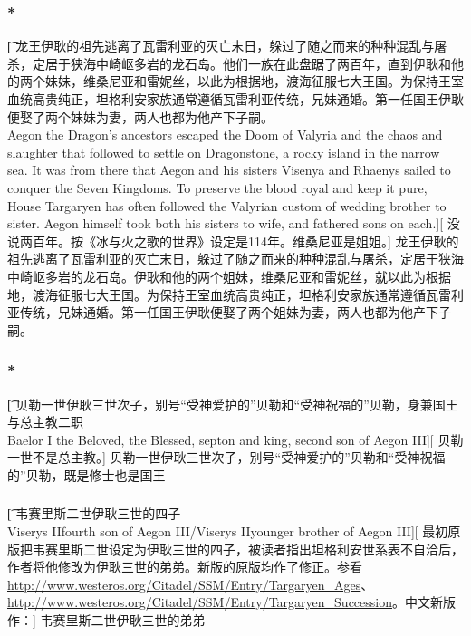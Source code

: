 \documentclass[12pt,a4paper]{article}
\begin{document}
\subsubsection{\color{red}*}\t[
	龙王伊耿的祖先逃离了瓦雷利亚的灭亡末日，躲过了随之而来的种种混乱与屠杀，定居于狭海中崎岖多岩的龙石岛。他们一族在此盘踞了两百年，直到伊耿和他的两个妹妹，维桑尼亚和雷妮丝，以此为根据地，渡海征服七大王国。为保持王室血统高贵纯正，坦格利安家族通常遵循瓦雷利亚传统，兄妹通婚。第一任国王伊耿便娶了两个妹妹为妻，两人也都为他产下子嗣。\\
	Aegon the Dragon's ancestors escaped the Doom of Valyria and the chaos and slaughter that followed to settle on Dragonstone, a rocky island in the narrow sea. It was from there that Aegon and his sisters Visenya and Rhaenys sailed to conquer the Seven Kingdoms. To preserve the blood royal and keep it pure, House Targaryen has often followed the Valyrian custom of wedding brother to sister. Aegon himself took both his sisters to wife, and fathered sons on each.][
	没说两百年。按《冰与火之歌的世界》设定是114年。维桑尼亚是姐姐。]
	龙王伊耿的祖先逃离了瓦雷利亚的灭亡末日，躲过了随之而来的种种混乱与屠杀，定居于狭海中崎岖多岩的龙石岛。伊耿和他的两个姐妹，维桑尼亚和雷妮丝，就以此为根据地，渡海征服七大王国。为保持王室血统高贵纯正，坦格利安家族通常遵循瓦雷利亚传统，兄妹通婚。第一任国王伊耿便娶了两个姐妹为妻，两人也都为他产下子嗣。
	
\subsubsection{\color{red}*}\t[
	贝勒一世\quad 伊耿三世次子，别号“受神爱护的”贝勒和“受神祝福的”贝勒，身兼国王与总主教二职\\
	Baelor I	the Beloved, the Blessed, septon and king, second son of Aegon III][
	贝勒一世不是总主教。]
	贝勒一世\quad 伊耿三世次子，别号“受神爱护的”贝勒和“受神祝福的”贝勒，既是修士也是国王
	
\subsubsection{}\t[	
	韦赛里斯二世\quad 伊耿三世的四子\\
	Viserys II\quad	fourth son of Aegon III\quad/\quad Viserys II\quad	younger brother of Aegon III][
	最初原版把韦赛里斯二世设定为伊耿三世的四子，被读者指出坦格利安世系表不自洽后，作者将他修改为伊耿三世的弟弟。新版的原版均作了修正。参看\url{http://www.westeros.org/Citadel/SSM/Entry/Targaryen_Ages}、\url{http://www.westeros.org/Citadel/SSM/Entry/Targaryen_Succession}。中文新版作：]
	韦赛里斯二世\quad 伊耿三世的弟弟
\newpage
\end{document}
